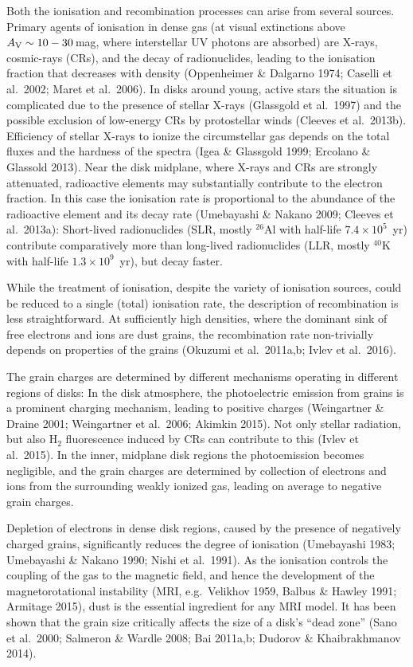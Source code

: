 \documentclass[10pt,fleqn,twoside]{article}
\begin{document}
Both the ionisation and recombination processes can arise from several sources. Primary agents of ionisation in dense gas
(at visual extinctions above $A_{\rm V}\sim 10-30$\,mag, where interstellar UV photons are absorbed) are X-rays, cosmic-rays (CRs), and the decay of radionuclides, leading to the ionisation fraction that decreases with density (Oppenheimer \& Dalgarno 1974; Caselli et al.\ 2002; Maret et al.\ 2006). In disks around young, active stars the situation is complicated due to the presence of stellar X-rays (Glassgold et al.\ 1997) and the possible exclusion of low-energy CRs by protostellar winds (Cleeves et al.\ 2013b). Efficiency of stellar X-rays to ionize the circumstellar gas depends on the total fluxes and the hardness of the spectra (Igea \& Glassgold 1999; Ercolano \& Glassold 2013). Near the disk midplane, where X-rays and CRs are strongly attenuated, radioactive elements may substantially contribute to the electron fraction. In this case the ionisation rate is proportional to the abundance of the radioactive element and its decay rate (Umebayashi \& Nakano 2009; Cleeves et al.\ 2013a): Short-lived radionuclides (SLR, mostly $^{26}$Al with half-life $7.4\times 10^5$~yr) contribute comparatively more than long-lived radionuclides (LLR, mostly $^{40}$K with half-life $1.3\times 10^9$~yr), but decay faster.

While the treatment of ionisation, despite the variety of ionisation sources, could be reduced to a single (total)
ionisation rate, the description of recombination is less straightforward. At sufficiently high densities, where the
dominant sink of free electrons and ions are dust grains, the recombination rate non-trivially depends on properties of the
grains (Okuzumi et al.\ 2011a,b; Ivlev et al.\ 2016).

The grain charges are determined by different mechanisms operating in different regions of disks: In the disk atmosphere, the
photoelectric emission from grains is a prominent charging mechanism, leading to positive charges (Weingartner \& Draine 2001; Weingartner et al.\ 2006; Akimkin 2015). Not only stellar radiation, but also H$_2$ fluorescence induced by CRs can contribute to this (Ivlev et al.\ 2015). In the inner, midplane disk regions the photoemission becomes negligible, and the grain charges are determined by collection of electrons and ions from the surrounding weakly ionized gas, leading on average to negative grain charges.

Depletion of electrons in dense disk regions, caused by the presence of negatively charged grains, significantly reduces the
degree of ionisation (Umebayashi 1983; Umebayashi \& Nakano 1990; Nishi et al.\ 1991). As the ionisation controls the coupling of the gas to the magnetic field, and hence the development of the magnetorotational instability (MRI, e.g.\ Velikhov 1959, Balbus \& Hawley 1991; Armitage 2015), dust is the essential ingredient for any MRI model. It has been shown that the grain size critically affects the size of a disk's ``dead zone'' (Sano et al.\ 2000; Salmeron \& Wardle 2008; Bai 2011a,b; Dudorov \& Khaibrakhmanov 2014).
\end{document}

